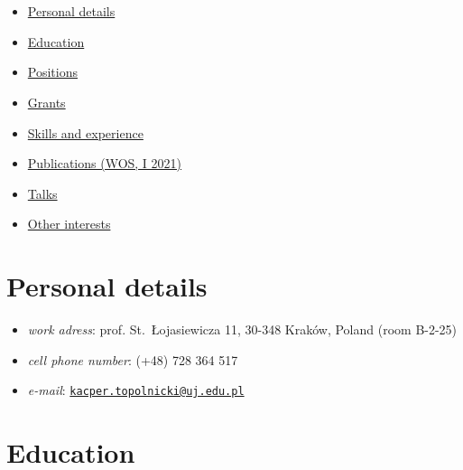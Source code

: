 \hypertarget{section}{%
\section{}\label{section}}

\begin{itemize}
\tightlist
\item
  \protect\hyperlink{personal-details}{Personal details}
\item
  \protect\hyperlink{education}{Education}
\item
  \protect\hyperlink{positions}{Positions}
\item
  \protect\hyperlink{grants}{Grants}
\item
  \protect\hyperlink{skills-and-experience}{Skills and experience}
\item
  \href{./0pl.html}{Publications (WOS, I 2021)}
\item
  \href{./00pl.html}{Talks}
\item
  \protect\hyperlink{other-interests}{Other interests}
\end{itemize}

\hypertarget{personal-details}{%
\section{Personal details}\label{personal-details}}

\begin{itemize}
\tightlist
\item
  \emph{work adress}: prof. St.~Łojasiewicza 11, 30-348 Kraków, Poland
  (room B-2-25)
\item
  \emph{cell phone number}: (+48) 728 364 517
\item
  \emph{e-mail}:
  \href{mailto:kacper.topolnicki@uj.edu.pl}{\nolinkurl{kacper.topolnicki@uj.edu.pl}}
\end{itemize}

\hypertarget{education}{%
\section{Education}\label{education}}

